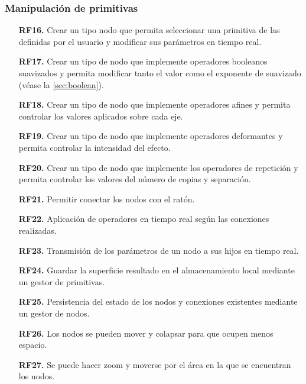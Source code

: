 \subsubsection*{Manipulación de primitivas}
\begin{enumerate}
    \item [\textbf{RF16.}] Crear un tipo nodo que permita seleccionar una primitiva de las definidas por el usuario y modificar sus parámetros en tiempo real.
    \item [\textbf{RF17.}] Crear un tipo de nodo que implemente operadores booleanos suavizados y permita modificar tanto el valor como el exponente de suavizado (véase la \autoref{sec:boolean}).
    \item [\textbf{RF18.}] Crear un tipo de nodo que implemente operadores afines y permita controlar los valores aplicados sobre cada eje.
    \item [\textbf{RF19.}] Crear un tipo de nodo que implemente operadores deformantes y permita controlar la intensidad del efecto.
    \item [\textbf{RF20.}] Crear un tipo de nodo que implemente los operadores de repetición y permita controlar los valores del número de copias y separación.
    \item [\textbf{RF21.}] Permitir conectar los nodos con el ratón.
    \item [\textbf{RF22.}] Aplicación de operadores en tiempo real según las conexiones realizadas.
    \item [\textbf{RF23.}] Transmisión de los parámetros de un nodo a sus hijos en tiempo real.
    \item [\textbf{RF24.}] Guardar la superficie resultado en el almacenamiento local mediante un gestor de primitivas.
    \item [\textbf{RF25.}] Persistencia del estado de los nodos y conexiones existentes mediante un gestor de nodos.
    \item [\textbf{RF26.}] Los nodos se pueden mover y colapsar para que ocupen menos espacio.
    \item [\textbf{RF27.}] Se puede hacer zoom y moverse por el área en la que se encuentran los nodos.
\end{enumerate}
